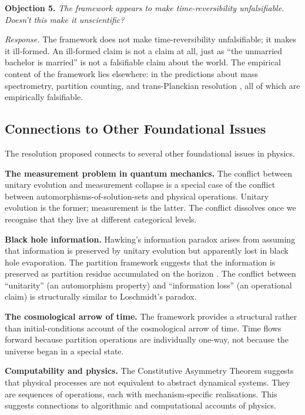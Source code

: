 \documentclass[twocolumn,10pt,a4paper]{article}
\theoremstyle{definition}
\theoremstyle{remark}
\begin{document}
\textbf{Objection 5.} \emph{The framework appears to make time-reversibility unfalsifiable. Doesn't this make it unscientific?}

\emph{Response.} The framework does not make time-reversibility unfalsifiable; it makes it ill-formed. An ill-formed claim is not a claim at all, just as ``the unmarried bachelor is married'' is not a falsifiable claim about the world. The empirical content of the framework lies elsewhere: in the predictions about mass spectrometry, partition counting, and trans-Planckian resolution \citep{sachikonye2025temporal}, all of which are empirically falsifiable.

\subsection{Connections to Other Foundational Issues}

The resolution proposed connects to several other foundational issues in physics.

\textbf{The measurement problem in quantum mechanics.} The conflict between unitary evolution and measurement collapse is a special case of the conflict between automorphisms-of-solution-sets and physical operations. Unitary evolution is the former; measurement is the latter. The conflict dissolves once we recognise that they live at different categorical levels.

\textbf{Black hole information.} Hawking's information paradox \citep{hawking1976} arises from assuming that information is preserved by unitary evolution but apparently lost in black hole evaporation. The partition framework suggests that the information is preserved as partition residue accumulated on the horizon \citep{sachikonye2025loschmidt}. The conflict between ``unitarity'' (an automorphism property) and ``information loss'' (an operational claim) is structurally similar to Loschmidt's paradox.

\textbf{The cosmological arrow of time.} The framework provides a structural rather than initial-conditions account of the cosmological arrow of time. Time flows forward because partition operations are individually one-way, not because the universe began in a special state.

\textbf{Computability and physics.} The Constitutive Asymmetry Theorem suggests that physical processes are not equivalent to abstract dynamical systems. They are sequences of operations, each with mechanism-specific realisations. This suggests connections to algorithmic and computational accounts of physics.
\end{document}
